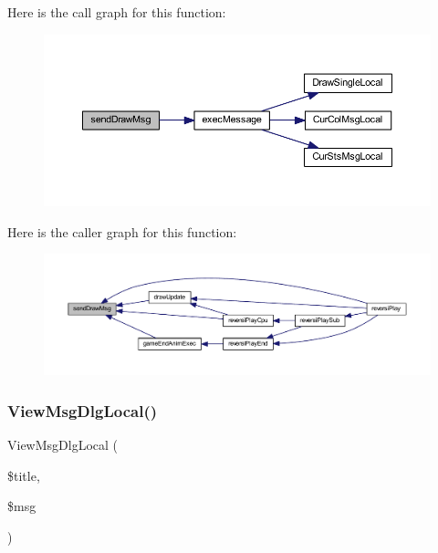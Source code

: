 Here is the call graph for this function\+:\nopagebreak
\begin{figure}[H]
\begin{center}
\leavevmode
\includegraphics[width=350pt]{class_reversi_play_af27aaf13f15a080c006432338a06c481_cgraph}
\end{center}
\end{figure}
Here is the caller graph for this function\+:\nopagebreak
\begin{figure}[H]
\begin{center}
\leavevmode
\includegraphics[width=350pt]{class_reversi_play_af27aaf13f15a080c006432338a06c481_icgraph}
\end{center}
\end{figure}
\mbox{\label{class_reversi_play_a2212d70313710a13422dd4fcb5da9cde}} 
\subsubsection{\texorpdfstring{View\+Msg\+Dlg\+Local()}{ViewMsgDlgLocal()}}
{\footnotesize\ttfamily View\+Msg\+Dlg\+Local (\begin{DoxyParamCaption}\item[{}]{\$title,  }\item[{}]{\$msg }\end{DoxyParamCaption})\hspace{0.3cm}{\ttfamily [private]}}



